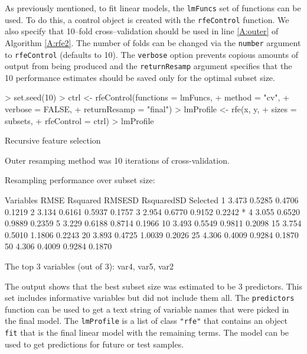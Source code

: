 \documentclass[12pt]{article}
\begin{document}
As previously mentioned, to fit linear models, the \texttt{lmFuncs} set of functions can be used. To do this, a control object is created with the \texttt{rfeControl} function. We also specify that 10--fold cross--validation should be used in line \ref{A:outer} of Algorithm  \ref{A:rfe2}. The number of folds can be changed via the \texttt{number} argument to \texttt{rfeControl} (defaults to 10). The \texttt{verbose} option prevents copious amounts of output from being produced and the \texttt{returnResamp} argument specifies that the 10 performance estimates should be saved only for the optimal subset size.

\begin{Schunk}
\begin{Sinput}
> set.seed(10)
> ctrl <- rfeControl(functions = lmFuncs,
+                    method = "cv",
+                    verbose = FALSE,
+                    returnResamp = "final")
> lmProfile <- rfe(x, y,
+                  sizes = subsets,
+                  rfeControl = ctrl)
> lmProfile
\end{Sinput}
\begin{Soutput}
Recursive feature selection

Outer resamping method was 10 iterations of cross-validation. 

Resampling performance over subset size:

 Variables  RMSE Rsquared RMSESD RsquaredSD Selected
         1 3.473   0.5285 0.4706     0.1219         
         2 3.134   0.6161 0.5937     0.1757         
         3 2.954   0.6770 0.9152     0.2242        *
         4 3.055   0.6520 0.9889     0.2359         
         5 3.229   0.6188 0.8714     0.1966         
        10 3.493   0.5549 0.9811     0.2098         
        15 3.754   0.5010 1.1806     0.2243         
        20 3.893   0.4725 1.0039     0.2026         
        25 4.306   0.4009 0.9284     0.1870         
        50 4.306   0.4009 0.9284     0.1870         

The top 3 variables (out of 3):
   var4, var5, var2
\end{Soutput}
\end{Schunk}
The output shows that the  best subset size was estimated to be 3 predictors. This set includes informative variables but did not include them all. The \texttt{predictors} function can be used to get a text string of variable names that were picked in the final model. The \texttt{lmProfile} is a list of class \texttt{"rfe"} that contains an object \texttt{fit} that is the final linear model with the remaining terms. The model can be used to get predictions for future or test samples. 
\end{document}
